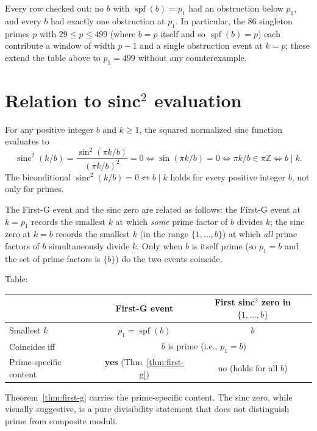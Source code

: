 \documentclass[11pt,reqno]{amsart}
\theoremstyle{definition}
\newcommand{\Z}{\mathbb{Z}}
\DeclareMathOperator{\spf}{spf}
\begin{document}
Every row checked out: no $b$ with $\spf(b) = p_1$ had an obstruction below
$p_1$, and every $b$ had exactly one obstruction at $p_1$. In particular,
the $86$ singleton primes $p$ with $29 \le p \le 499$ (where $b = p$ itself
and so $\spf(b) = p$) each contribute a window of width $p - 1$ and a single
obstruction event at $k = p$; these extend the table above to $p_1 = 499$
without any counterexample.

\section{Relation to sinc${}^2$ evaluation}
\label{sec:sinc}

For any positive integer $b$ and $k \ge 1$, the squared normalized sinc
function evaluates to
\[
  \operatorname{sinc}^2(k/b) = \frac{\sin^2(\pi k / b)}{(\pi k / b)^2}
  = 0
  \iff
  \sin(\pi k / b) = 0
  \iff
  \pi k / b \in \pi \Z
  \iff
  b \mid k.
\]
The biconditional $\operatorname{sinc}^2(k/b) = 0 \iff b \mid k$ holds for
every positive integer $b$, not only for primes.

The First-G event and the sinc zero are related as follows: the First-G
event at $k = p_1$ records the smallest $k$ at which \emph{some} prime
factor of $b$ divides $k$; the sinc zero at $k = b$ records the smallest
$k$ (in the range $\{1, \ldots, b\}$) at which \emph{all} prime factors of
$b$ simultaneously divide $k$. Only when $b$ is itself prime (so $p_1 = b$
and the set of prime factors is $\{b\}$) do the two events coincide.

Table:

\begin{center}
\begin{tabular}{l|c|c}
   & First-G event & First sinc${}^2$ zero in $\{1,\ldots,b\}$ \\ \hline
  Smallest $k$ & $p_1 = \spf(b)$ & $b$ \\
  Coincides iff & \multicolumn{2}{c}{$b$ is prime (i.e., $p_1 = b$)} \\
  Prime-specific content & \textbf{yes} (Thm~\ref{thm:first-g}) &
    no (holds for all $b$)
\end{tabular}
\end{center}

Theorem~\ref{thm:first-g} carries the prime-specific content. The sinc
zero, while visually suggestive, is a pure divisibility statement that does
not distinguish prime from composite moduli.
\end{document}
